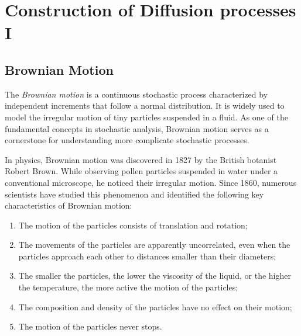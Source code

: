 %
%
% 


\chapter{Construction of Diffusion processes I}


\section{Brownian Motion}
The {\em Brownian motion} is a continuous stochastic process characterized by independent increments that follow a normal distribution. It is widely used to model the irregular motion of tiny particles suspended in a fluid. As one of the fundamental concepts in stochastic analysis, Brownian motion serves as a cornerstone for understanding more complicate stochastic processes.

In physics, Brownian motion was discovered in 1827 by the British botanist Robert Brown. While observing pollen particles suspended in water under a conventional microscope, he noticed their irregular motion. Since 1860, numerous scientists have studied this phenomenon and identified the following key characteristics of Brownian motion: 
\begin{enumerate}
    \item The motion of the particles consists of translation and rotation; %
    \item The movements of the particles are apparently uncorrelated, even when the particles approach each other to distances smaller than their diameters;
    \item The smaller the particles, the lower the viscosity of the liquid, or the higher the temperature, the more active the motion of the particles;
    \item The composition and density of the particles have no effect on their motion;
    \item The motion of the particles never stops.
\end{enumerate}

